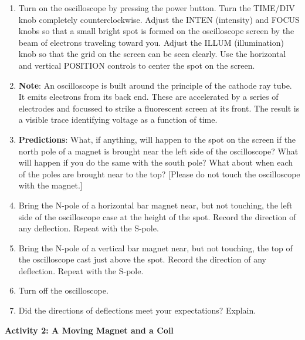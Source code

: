 \begin{enumerate}
\item Turn on the oscilloscope by pressing the power button. Turn the TIME/DIV
knob completely counterclockwise. Adjust the INTEN (intensity) and
FOCUS knobs so that a small bright spot is formed on the oscilloscope
screen by the beam of electrons traveling toward you. Adjust the ILLUM
(illumination) knob so that the grid on the screen can be seen clearly.
Use the horizontal and vertical POSITION controls to center the spot
on the screen.
\item \textbf{Note}: An oscilloscope is built around the principle of the
cathode ray tube. It emits electrons from its back end. These are
accelerated by a series of electrodes and focussed to strike a fluorescent
screen at its front. The result is a visible trace identifying voltage
as a function of time.
\item \textbf{Predictions}: What, if anything, will happen to the spot on
the screen if the north pole of a magnet is brought near the left
side of the oscilloscope? What will happen if you do the same with
the south pole? What about when each of the poles are brought near
to the top? {[}Please do not touch the oscilloscope with the magnet.{]} \vspace{30mm}

\item Bring the N-pole of a horizontal bar magnet near, but not touching,
the left side of the oscilloscope case at the height of the spot.
Record the direction of any deflection. Repeat with the S-pole.\vspace{20mm}

\item Bring the N-pole of a vertical bar magnet near, but not touching,
the top of the oscilloscope cast just above the spot. Record the direction
of any deflection. Repeat with the S-pole.\vspace{20mm}

\item Turn off the oscilloscope.
\item Did the directions of deflections meet your expectations? Explain. \vspace{15mm}

\end{enumerate}
\textbf{Activity 2: A Moving Magnet and a Coil}

